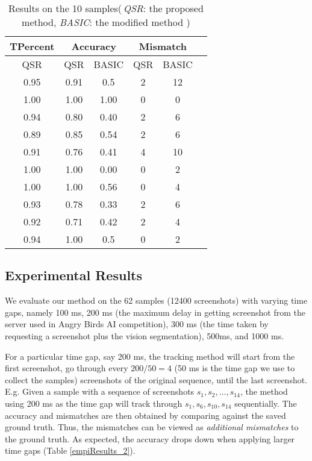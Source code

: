 \documentclass[letterpaper]{article}
\begin{document}
\begin{table}[h!]
\caption{Results on the 10 samples(\,\emph{QSR}: the proposed method, \emph{BASIC}: the modified method )}\label{empiResults}
\centering
\begin{tabular}{c|c|c|c|c|c}
\hline
{TPercent} & \multicolumn{2}{c}{Accuracy} & \multicolumn{2}{c}{Mismatch}\\
\hline
QSR  & QSR & BASIC & QSR & BASIC\\
\hline
0.95& 0.91 & 0.5 & 2 & 12\\
1.00&1.00 & 1.00 & 0 & 0\\
0.94&0.80 & 0.40 & 2 & 6\\
0.89&0.85 & 0.54 & 2 & 6\\
0.91&0.76 & 0.41 & 4 & 10\\
1.00&1.00 & 0.00 & 0 & 2\\
1.00&1.00 & 0.56 & 0 & 4\\
0.93&0.78 & 0.33 & 2 & 6 \\
0.92&0.71 & 0.42 & 2 & 4\\
0.94&1.00 & 0.5 & 0 & 2\\
\hline
\end{tabular}
\end{table}

\subsection{Experimental Results}

We evaluate our method on the 62 samples (12400 screenshots) with varying time gaps, namely 100 ms, 200 ms (the maximum delay in getting screenshot from the server used in Angry Birds AI competition), 300 ms (the time taken by requesting a screenshot plus the vision segmentation), 500ms, and 1000 ms.

For a particular time gap, say 200 ms, the tracking method will start from the first screenshot, go through every $200/50 = 4$ (50 ms is the time gap we use to collect the samples) screenshots of the original sequence, until the last screenshot. E.g. Given a sample with a sequence of screenshots $s_1, s_2, ..., s_{14}$, the method using 200 ms as the time gap will track through $s_1, s_6, s_{10}, s_{14}$ sequentially. The accuracy and mismatches are then obtained by comparing against the saved ground truth. Thus, the mismatches can be viewed as \emph{additional mismatches} to the ground truth. As expected, the accuracy drops down when applying larger time gaps (Table \ref{empiResults_2}). 
\end{document}
